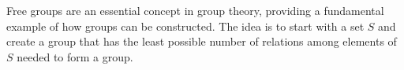 






Free groups are an essential concept in group theory, providing a fundamental example of how groups can be constructed. The idea is to start with a set \(S\) and create a group that has the least possible number of relations among elements of \(S\) needed to form a group.

